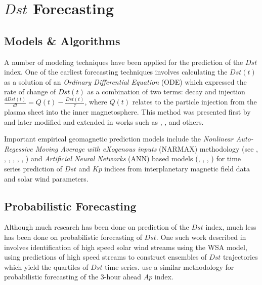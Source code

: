 \documentclass{article}
\begin{document}
\section{$Dst$ Forecasting}

\subsection{Models \& Algorithms}

A number of modeling techniques have been applied for the prediction
of the $Dst$ index. One of the earliest forecasting techniques
involves calculating the $Dst(t)$ as a solution of an \emph{Ordinary
  Differential Equation} (ODE) which expressed the rate of change of
$Dst(t)$ as a combination of two terms: decay and injection $\frac{d
  Dst(t)}{dt} = Q(t) - \frac{Dst(t)}{\tau}$, where $Q(t)$ relates to
the particle injection from the plasma sheet into the inner
magnetosphere. This method was presented first by \citet{JGR:JGR10260}
and later modified and extended in works such as \citet{Wang:Dst},
\citet{JGRA:JGRA14856}, \citet{Ballatore2014} and others.

Important empirical geomagnetic prediction models include the
\emph{Nonlinear Auto-Regessive Moving Average with eXogenous inputs}
(NARMAX) methodology (see \citet{doi:10.1080/00207178908559767},
\citet{GRL:GRL13494}, \citet{GRL:GRL20944}, \citet{JGRA:JGRA18657},
\citet{balikhin:narmax}, \citet{JGRA:JGRA20661},
\citet{JGRA:JGRA50192}) and \emph{Artificial Neural Networks} (ANN)
based models (\citet{Lund}, \citet{JGRA:JGRA17461},
\citet{SWE:SWE286}, \citet{pallocchia:hal-00318011}) for time series
prediction of $Dst$ and $Kp$ indices from interplanetary magnetic
field data and solar wind parameters. 

\subsection{Probabilistic Forecasting}
Although much research has been done on prediction of the $Dst$ index,
much less has been done on probabilistic forecasting of $Dst$. One
such work described in \citet{McPherron:2013} involves identification
of high speed solar wind streams using the WSA model, using
predictions of high speed streams to construct ensembles of $Dst$
trajectories which yield the quartiles of $Dst$ time
series. \citet{mcpherron2004probabilistic} use a similar methodology
for probabilistic forecasting of the 3-hour ahead $Ap$ index. 
\end{document}

